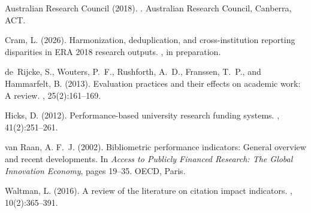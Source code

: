 \documentclass[11pt,a4paper]{article}
\begin{document}

\begin{thebibliography}{}

Australian Research Council (2018).
.
\newblock Australian Research Council, Canberra, ACT.

Cram, L. (2026).
\newblock Harmonization, deduplication, and cross-institution reporting disparities in {ERA} 2018 research outputs.
, in preparation.

de~Rijcke, S., Wouters, P.~F., Rushforth, A.~D., Franssen, T.~P., and Hammarfelt, B. (2013).
\newblock Evaluation practices and their effects on academic work: A review.
, 25(2):161--169.

Hicks, D. (2012).
\newblock Performance-based university research funding systems.
, 41(2):251--261.

van Raan, A. F.~J. (2002).
\newblock Bibliometric performance indicators: General overview and recent developments.
\newblock In {\em Access to Publicly Financed Research: The Global Innovation Economy}, pages 19--35. OECD, Paris.

Waltman, L. (2016).
\newblock A review of the literature on citation impact indicators.
, 10(2):365--391.

\end{thebibliography}
\end{document}
